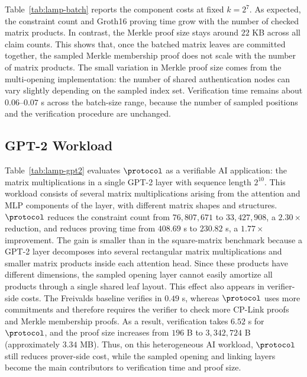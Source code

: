 Table~\ref{tab:lamp-batch} reports the component costs at fixed \(k=2^7\).
As expected, the constraint count and Groth16 proving time grow with the number
of checked matrix products.  In contrast, the Merkle proof size stays around
\(22\) KB across all claim counts.  This shows that, once the batched matrix
leaves are committed together, the sampled Merkle membership proof does not
scale with the number of matrix products.  The small variation in Merkle proof
size comes from the multi-opening implementation: the number of shared
authentication nodes can vary slightly depending on the sampled index set.
Verification time remains about \(0.06\)--\(0.07\) s across the batch-size
range, because the number of sampled positions and the verification procedure
are unchanged.

\subsection{GPT-2 Workload}
\label{sec:eval-gpt2}

Table~\ref{tab:lamp-gpt2} evaluates \(\protocol\) as a verifiable AI
application: the matrix multiplications in a single GPT-2 layer with sequence
length \(2^{10}\).  This workload consists of several matrix multiplications
arising from the attention and MLP components of the layer, with different
matrix shapes and structures.
\(\protocol\) reduces the constraint count from \(76{,}807{,}671\) to
\(33{,}427{,}908\), a \(2.30\times\) reduction, and reduces proving time from
\(408.69\) s to \(230.82\) s, a \(1.77\times\) improvement.  The gain is smaller
than in the square-matrix benchmark because a GPT-2 layer decomposes into
several rectangular matrix multiplications and smaller matrix products inside
each attention head.  Since these products have different dimensions, the
sampled opening layer cannot easily amortize all products through a single
shared leaf layout.
This effect also appears in verifier-side costs.  The Freivalds baseline
verifies in \(0.49\) s, whereas \(\protocol\) uses more commitments and therefore
requires the verifier to check more CP-Link proofs and Merkle membership proofs.
As a result, verification takes \(6.52\) s for \(\protocol\), and the proof size
increases from \(196\) B to \(3{,}342{,}724\) B (approximately \(3.34\) MB).
Thus, on this heterogeneous AI workload,
\(\protocol\) still reduces prover-side cost, while the sampled opening and
linking layers become the main contributors to verification time and proof size.


